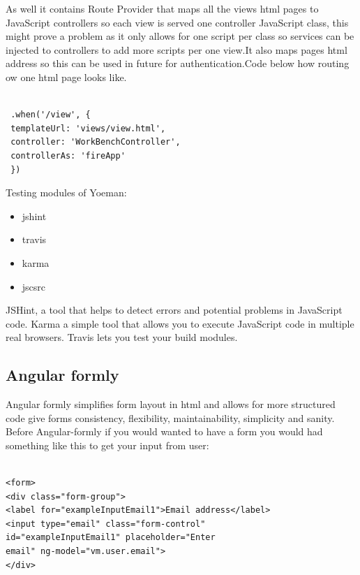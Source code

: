 \begin{itemize}
\begin{itemize}
\end{itemize}
\bigbreak

As well it contains Route Provider that maps all the views html pages to JavaScript controllers so each view is served one controller JavaScript class, this might prove a problem as it only allows for one script per class so services can be injected to controllers to add more scripts per one view.It also maps pages html address so this can be used in future for authentication.Code below how routing ow one html page looks like.
\bigbreak
\begin{verbatim}

 .when('/view', {
 templateUrl: 'views/view.html',
 controller: 'WorkBenchController',
 controllerAs: 'fireApp'
 })

\end{verbatim}
\bigbreak
Testing modules of Yoeman:
\bigbreak

\begin{itemize}
	
	\item jshint 
	\item travis
	\item karma
	\item jscsrc
	
\end{itemize}
\bigbreak

JSHint, a tool that helps to detect errors and potential problems in  JavaScript code.
Karma a simple tool that allows you to execute JavaScript code in multiple real browsers.
Travis lets you test your build modules.






\subsection{Angular formly}
\bigbreak
Angular formly simplifies form layout in html and allows for more structured code give forms consistency, flexibility, maintainability, simplicity and sanity. Before Angular-formly if you would wanted to have a form you would had something like this to get your input from user:

\bigbreak
\begin{verbatim}

<form>
<div class="form-group">
<label for="exampleInputEmail1">Email address</label>
<input type="email" class="form-control" 
id="exampleInputEmail1" placeholder="Enter 
email" ng-model="vm.user.email">
</div>


\end{verbatim}
\end{itemize}
